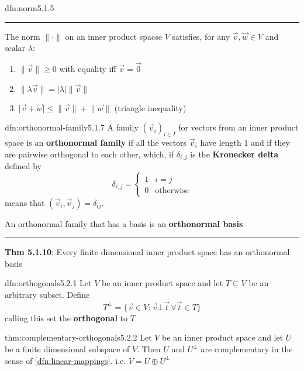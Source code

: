 \documentclass[landscape, 8pt]{extarticle}
\begin{document}
\begin{multicols}{3}
\begin{dfn}[Norm]{dfn:norm}{5.1.5}
    \noindent\rule{\textwidth}{0.2pt}
    The norm $\lVert \cdot \rVert$ on an inner product spacse $V$ satisfies, for any $\vec{v}, \vec{w}\in V$ and scalar $\lambda$:
    \begin{enumerate}
        \setlength\itemsep{0em}
        \item $\lVert \vec{v} \rVert \ge 0$ with equality iff $\vec{v} = \vec{0}$
        \item $\lVert \lambda \vec{v} \rVert = \lvert \lambda \rvert \lVert  \vec{v} \rVert$
        \item $\lvert \vec{v} + \vec{w} \rvert \le \lVert \vec{v} \rVert + \lVert \vec{w} \rVert$ (triangle inequality)
    \end{enumerate}
\end{dfn}

\begin{dfn}{dfn:orthonormal-family}{5.1.7}
    A family $(\vec{v}_{i})_{i\in I}$ for vectors from an inner product space is an \textbf{orthonormal family} if all the vectors $\vec{v}_{i}$ have length $1$ and if they are pairwise orthogonal to each other, which, if $\delta_{i,j}$ is the \textbf{Kronecker delta} defined by
    \[\delta_{i, j} = \begin{cases}
        1 & i = j \\
        0 & \text{otherwise}
    \end{cases}\]
    means that $(\vec{v}_{i}, \vec{v}_{j}) = \delta_{ij}$.

    An orthonormal family that has a basis is an \textbf{orthonormal basis}
    
    \noindent\rule{\textwidth}{0.2pt}
    \textbf{Thm 5.1.10}: Every finite dimensional inner product space has an orthonormal basis
\end{dfn}

\begin{dfn}{dfn:orthogonals}{5.2.1}
    Let $V$ be an inner product space and let $T \subseteq V$ be an arbitrary subset. Define
    \[T^{\bot} = \{\vec{v} \in V : \vec{v} \bot \vec{t} \, \forall \vec{t}\in T\}\]
    calling this set the \textbf{orthogonal} to $T$
\end{dfn}

\begin{thm}{thm:complementary-orthogonals}{5.2.2}
    Let $V$ be an inner product space and let $U$ be a finite dimensional subspace of $V$. Then $U$ and $U^{\bot}$ are complementary in the sense of \ref{dfn:linear-mappings}. i.e. $V = U \oplus U^{\bot}$
\end{thm}


\end{multicols}
\end{document}
